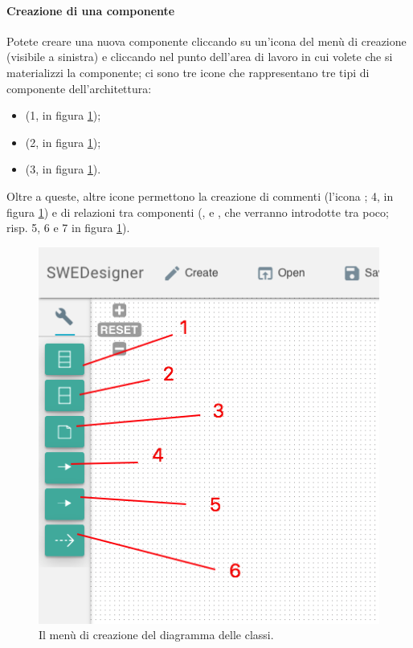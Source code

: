 \paragraph{Creazione di una componente} \label{par:creaz_class} Potete creare una nuova componente cliccando su un'icona del menù di creazione (visibile a sinistra) e cliccando nel punto dell'area di lavoro in cui volete che si materializzi la componente; ci sono tre icone che rappresentano tre tipi di componente dell'architettura:
\begin{itemize}
	\item {} (1, in figura \ref{fig:creation_class});
	\item {} (2, in figura \ref{fig:creation_class});
	\item {} (3, in figura \ref{fig:creation_class}).
\end{itemize}
Oltre a queste, altre icone permettono la creazione di commenti (l'icona ; 4, in figura \ref{fig:creation_class}) e di relazioni tra componenti (,  e , che verranno introdotte tra poco; risp. 5, 6 e 7 in figura \ref{fig:creation_class}).

\begin{figure}[h]
\centering
	\includegraphics[scale=0.4]{img/creation_class}
	\caption{Il menù di creazione del diagramma delle classi.}
	\label{fig:creation_class}
\end{figure}


